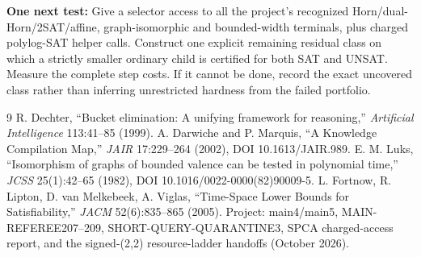 \documentclass[11pt]{article}
\begin{document}
\noindent\textbf{One next test:} Give a selector access to all the project's
recognized Horn/dual-Horn/2SAT/affine, graph-isomorphic and bounded-width
terminals, plus charged polylog-SAT helper calls. Construct one explicit
remaining residual class on which a strictly smaller ordinary child is
certified for both SAT and UNSAT. Measure the complete step costs. If it
cannot be done, record the exact uncovered class rather than inferring
unrestricted hardness from the failed portfolio.

\begin{thebibliography}{9}
 R. Dechter, ``Bucket elimination: A unifying framework
for reasoning,'' \emph{Artificial Intelligence} 113:41--85 (1999).
 A. Darwiche and P. Marquis, ``A Knowledge Compilation Map,''
\emph{JAIR} 17:229--264 (2002), DOI 10.1613/JAIR.989.
 E. M. Luks, ``Isomorphism of graphs of bounded valence can be
tested in polynomial time,'' \emph{JCSS} 25(1):42--65 (1982),
DOI 10.1016/0022-0000(82)90009-5.
 L. Fortnow, R. Lipton, D. van Melkebeek, A. Viglas,
``Time-Space Lower Bounds for Satisfiability,'' \emph{JACM} 52(6):835--865 (2005).
 Project: main4/main5, MAIN-REFEREE207--209,
SHORT-QUERY-QUARANTINE3, SPCA charged-access report, and the signed-(2,2)
resource-ladder handoffs (October 2026).
\end{thebibliography}
\end{document}
